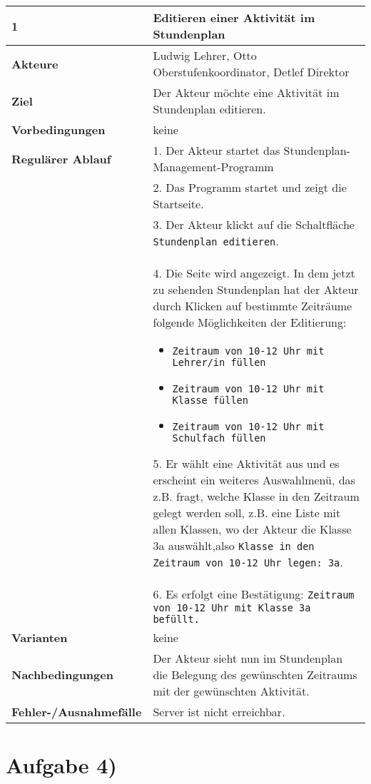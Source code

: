 \documentclass{swp1}
\begin{document}
	
	\begin{tabular}
		{|p{5cm}|p{10cm}|} \hline \textbf{1} & \textbf{Editieren einer Aktivität im Stundenplan} \\
		\hline \textbf{Akteure} & Ludwig Lehrer, Otto Oberstufenkoordinator, Detlef Direktor\\
		\hline \textbf{Ziel} & Der Akteur möchte eine Aktivität im Stundenplan editieren. \\
		\hline \textbf{Vorbedingungen} & keine \\
		\hline \textbf{Regulärer Ablauf} & 1. Der Akteur startet das Stundenplan-Management-Programm \\
		&2. Das Programm startet und zeigt die Startseite. \\
		&3. Der Akteur klickt auf die Schaltfläche \texttt{Stundenplan editieren}. \\
		&4. Die Seite wird angezeigt. In dem jetzt zu sehenden Stundenplan hat der Akteur durch Klicken auf bestimmte Zeiträume folgende Möglichkeiten der Editierung:
		\begin{itemize}
		\item \texttt{Zeitraum von 10-12 Uhr mit Lehrer/in füllen}
		\item \texttt{Zeitraum von 10-12 Uhr mit Klasse füllen}
		\item \texttt{Zeitraum von 10-12 Uhr mit Schulfach füllen}
\end{itemize}		   
5. Er wählt eine Aktivität aus und es erscheint ein weiteres Auswahlmenü, das z.B. fragt, welche Klasse in den Zeitraum gelegt werden soll, z.B. eine Liste mit allen Klassen, wo der Akteur die Klasse 3a auswählt,also \texttt{Klasse in  den Zeitraum von 10-12 Uhr legen: 3a}.\\
&6. Es erfolgt eine Bestätigung: \texttt{Zeitraum von 10-12 Uhr mit Klasse 3a befüllt.}\\

		\hline \textbf{Varianten} & keine \\
		\hline \textbf{Nachbedingungen} & Der Akteur sieht nun im Stundenplan die Belegung des gewünschten Zeitraums mit der gewünschten Aktivität.\\
		\hline \textbf{Fehler-/Ausnahmefälle} & Server ist nicht erreichbar. \\
		\hline 
	\end{tabular}






\section*{Aufgabe 4)}
\end{document}
